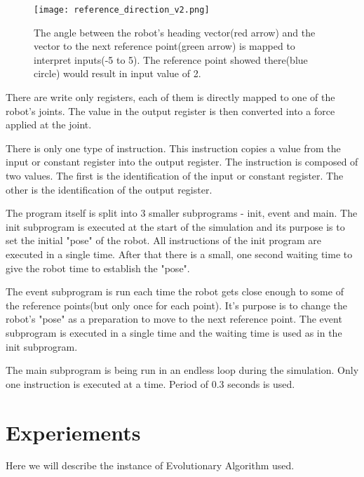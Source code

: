 \documentclass{ExcelAtFIT}
\begin{document}
\begin{figure}[t]
	\centering
	{\texttt{[image: reference\_direction\_v2.png]}}
	\caption{
		The angle between the robot's heading vector(red arrow) and the vector to the next reference point(green arrow) is mapped to interpret inputs(-5 to 5).
		The reference point showed there(blue circle) would result in input value of 2.
	}
	\label{fig:ReferenceDirection}
\end{figure}

There are write only registers, each of them is directly mapped to one of the robot's joints.
The value in the output register is then converted into a force applied at the joint.

There is only one type of instruction.
This instruction copies a value from the input or constant register into the output register.
The instruction is composed of two values.
The first is the identification of the input or constant register.
The other is the identification of the output register.

The program itself is split into 3 smaller subprograms - init, event and main.
The init subprogram is executed at the start of the simulation and its purpose is to set the initial "pose" of the robot.
All instructions of the init program are executed in a single time.
After that there is a small, one second waiting time to give the robot time to establish the "pose".

The event subprogram is run each time the robot gets close enough to some of the reference points(but only once for each point).
It's purpose is to change the robot's "pose" as a preparation to move to the next reference point.
The event subprogram is executed in a single time and the waiting time is used as in the init subprogram.

The main subprogram is being run in an endless loop during the simulation.
Only one instruction is executed at a time.
Period of 0.3 seconds is used.


\section{Experiements}
\label{sec:Experiments}
Here we will describe the instance of Evolutionary Algorithm used.
\end{document}
